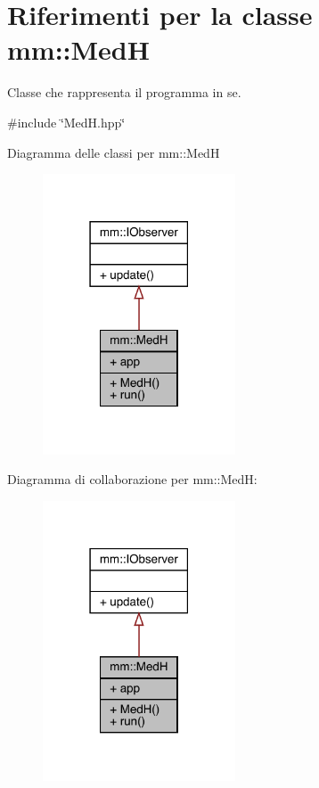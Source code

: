 \hypertarget{classmm_1_1_med_h}{}\section{Riferimenti per la classe mm\+:\+:MedH}
\label{classmm_1_1_med_h}


Classe che rappresenta il programma in se.  




{\ttfamily \#include \char`\"{}Med\+H.\+hpp\char`\"{}}



Diagramma delle classi per mm\+:\+:MedH\nopagebreak
\begin{figure}[H]
\begin{center}
\leavevmode
\includegraphics[width=162pt]{d3/d8f/classmm_1_1_med_h__inherit__graph}
\end{center}
\end{figure}


Diagramma di collaborazione per mm\+:\+:MedH\+:\nopagebreak
\begin{figure}[H]
\begin{center}
\leavevmode
\includegraphics[width=162pt]{dc/d39/classmm_1_1_med_h__coll__graph}
\end{center}
\end{figure}
